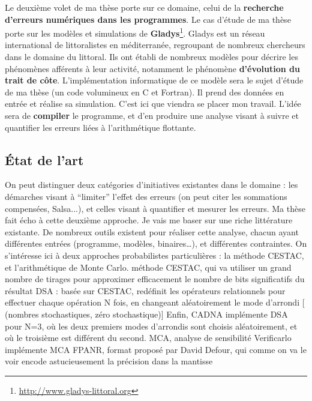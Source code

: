 \documentclass[a4paper,11pt]{article}
\begin{document}
Le deuxième volet de ma thèse porte sur ce domaine, celui de la \textbf{recherche d'erreurs numériques dans les programmes}.
Le cas d’étude de ma thèse porte sur les modèles et simulations de \textbf{Gladys}\footnote{\url{http://www.gladys-littoral.org}}.
Gladys est un réseau international de littoralistes en méditerranée, regroupant de nombreux chercheurs dans le domaine du littoral.
Ils ont établi de nombreux modèles pour décrire les phénomènes afférents à leur activité, notamment le phénomène \textbf{d’évolution du trait de côte}.
L’implémentation informatique de ce modèle sera le sujet d’étude de ma thèse (un code volumineux en C et Fortran). Il prend des données en entrée et réalise sa simulation. C'est ici que viendra se placer mon travail. L’idée sera de \textbf{compiler} le programme, et d’en produire une analyse visant à suivre et quantifier les erreurs liées à l’arithmétique flottante.


\subsection{État de l’art}

On peut distinguer deux catégories d'initiatives existantes dans le domaine : les démarches visant à “limiter” l’effet des erreurs (on peut citer les sommations compensées, Salsa...), et celles visant à quantifier et mesurer les erreurs.
Ma thèse fait écho à cette deuxième approche.
Je vais me baser sur une riche littérature existante.
De nombreux outils existent pour réaliser cette analyse, chacun ayant différentes entrées (programme, modèles, binaires…), et différentes contraintes.
On s’intéresse ici à deux approches probabilistes particulières : la méthode CESTAC, et l’arithmétique de Monte Carlo.
méthode CESTAC, qui va utiliser un grand nombre de tirages pour approximer efficacement le nombre de bits significatifs du résultat
DSA : basée sur CESTAC, redéfinit les opérateurs relationnels pour effectuer chaque opération N fois, en changeant aléatoirement le mode d’arrondi [ (nombres stochastiques, zéro stochastique)] 
Enfin, CADNA implémente DSA pour N=3, où les deux premiers modes d’arrondis sont choisis aléatoirement, et où le troisième est différent du second.
MCA, analyse de sensibilité
Verificarlo implémente MCA
FPANR, format proposé par David Defour, qui comme on va le voir encode astucieusement la précision dans la mantisse
\end{document}
